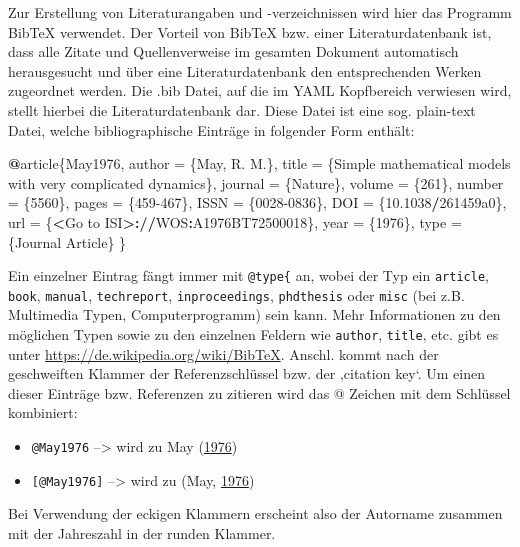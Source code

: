 \documentclass[a4paper,12pt]{article}
\providecommand{\tightlist}{%
  \setlength{\itemsep}{0pt}\setlength{\parskip}{0pt}}
\newenvironment{Shaded}{\begin{snugshade}}{\end{snugshade}}
\newcommand{\DecValTok}[1]{\textcolor[rgb]{0.00,0.00,0.81}{#1}}
\newcommand{\ErrorTok}[1]{\textcolor[rgb]{0.64,0.00,0.00}{\textbf{#1}}}
\newcommand{\FloatTok}[1]{\textcolor[rgb]{0.00,0.00,0.81}{#1}}
\newcommand{\NormalTok}[1]{#1}
\newcommand{\OperatorTok}[1]{\textcolor[rgb]{0.81,0.36,0.00}{\textbf{#1}}}
\newcommand{\StringTok}[1]{\textcolor[rgb]{0.31,0.60,0.02}{#1}}
\begin{document}
Zur Erstellung von Literaturangaben und -verzeichnissen wird hier das Programm BibTeX verwendet. Der Vorteil von BibTeX bzw. einer Literaturdatenbank ist, dass alle Zitate und Quellenverweise im gesamten Dokument automatisch herausgesucht und über eine Literaturdatenbank den entsprechenden Werken zugeordnet werden. Die .bib Datei, auf die im YAML Kopfbereich verwiesen wird, stellt hierbei die Literaturdatenbank dar. Diese Datei ist eine sog. plain-text Datei, welche bibliographische Einträge in folgender Form enthält:
\begin{Shaded}
\begin{Highlighting}[]
\OperatorTok{@}\NormalTok{article\{May1976,}
\NormalTok{   author =}\StringTok{ }\NormalTok{\{May, R. M.\},}
\NormalTok{   title =}\StringTok{ }\NormalTok{\{Simple mathematical models with very }
\NormalTok{     complicated dynamics\},}
\NormalTok{   journal =}\StringTok{ }\NormalTok{\{Nature\},}
\NormalTok{   volume =}\StringTok{ }\NormalTok{\{}\DecValTok{261}\NormalTok{\},}
\NormalTok{   number =}\StringTok{ }\NormalTok{\{}\DecValTok{5560}\NormalTok{\},}
\NormalTok{   pages =}\StringTok{ }\NormalTok{\{}\DecValTok{459-467}\NormalTok{\},}
\NormalTok{   ISSN =}\StringTok{ }\NormalTok{\{}\DecValTok{0028-0836}\NormalTok{\},}
\NormalTok{   DOI =}\StringTok{ }\NormalTok{\{}\FloatTok{10.1038}\OperatorTok{/}\NormalTok{261459a0\},}
\NormalTok{   url =}\StringTok{ }\NormalTok{\{}\OperatorTok{<}\NormalTok{Go to ISI}\OperatorTok{>}\ErrorTok{://}\NormalTok{WOS}\OperatorTok{:}\NormalTok{A1976BT72500018\},}
\NormalTok{   year =}\StringTok{ }\NormalTok{\{}\DecValTok{1976}\NormalTok{\},}
\NormalTok{   type =}\StringTok{ }\NormalTok{\{Journal Article\}}
\NormalTok{\}}
\end{Highlighting}
\end{Shaded}
Ein einzelner Eintrag fängt immer mit \texttt{@type\{} an, wobei der Typ ein \texttt{article}, \texttt{book}, \texttt{manual}, \texttt{techreport}, \texttt{inproceedings}, \texttt{phdthesis} oder \texttt{misc} (bei z.B. Multimedia Typen, Computerprogramm) sein kann. Mehr Informationen zu den möglichen Typen sowie zu den einzelnen Feldern wie \texttt{author}, \texttt{title}, etc. gibt es unter \url{https://de.wikipedia.org/wiki/BibTeX}. Anschl. kommt nach der geschweiften Klammer der Referenzschlüssel bzw. der ‚citation key`. Um einen dieser Einträge bzw. Referenzen zu zitieren wird das @ Zeichen mit dem Schlüssel kombiniert:
\begin{itemize}
\tightlist
\item
  \texttt{@May1976} --\textgreater{} wird zu May (\protect\hyperlink{ref-May1976}{1976})
\item
  \texttt{{[}@May1976{]}} --\textgreater{} wird zu (May, \protect\hyperlink{ref-May1976}{1976})
\end{itemize}
Bei Verwendung der eckigen Klammern erscheint also der Autorname zusammen mit der Jahreszahl in der runden Klammer.
\end{document}
